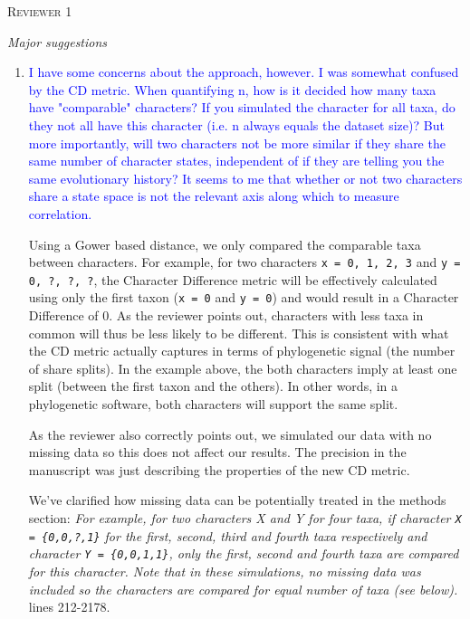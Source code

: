 \documentclass[12pt,letterpaper]{article}
\renewcommand{\section}[1]{%
\bigskip
\begin{center}
\begin{Large}
\normalfont\scshape #1
\medskip
\end{Large}
\end{center}}
\renewcommand{\subsection}[1]{%
\bigskip
\begin{center}
\begin{large}
\normalfont\itshape #1
\end{large}
\end{center}}
\begin{document}
%
%


\section{Reviewer 1}

\subsection{Major suggestions}

\begin{enumerate}

\item{\textcolor{blue}{I have some concerns about the approach, however. I was somewhat confused by the CD metric. When quantifying n, how is it decided how many taxa have "comparable" characters?
If you simulated the character for all taxa, do they not all have this character (i.e. n always equals the dataset size)?
But more importantly, will two characters not be more similar if they share the same number of character states, independent of if they are telling you the same evolutionary history?
It seems to me that whether or not two characters share a state space is not the relevant axis along which to measure correlation.}}
\label{gower}

Using a Gower based distance, we only compared the comparable taxa between characters.
For example, for two characters \texttt{x = {0, 1, 2, 3}} and \texttt{y = {0, ?, ?, ?}}, the Character Difference metric will be effectively calculated using only the first taxon (\texttt{x = {0}} and \texttt{y = {0}}) and would result in a Character Difference of 0.
As the reviewer points out, characters with less taxa in common will thus be less likely to be different.
This is consistent with what the CD metric actually captures in terms of phylogenetic signal (the number of share splits).
In the example above, the both characters imply at least one split (between the first taxon and the others).
In other words, in a phylogenetic software, both characters will support the same split.

As the reviewer also correctly points out, we simulated our data with no missing data so this does not affect our results.
The precision in the manuscript was just describing the properties of the new CD metric.

We've clarified how missing data can be potentially treated in the methods section:
\textit{For example, for two characters X and Y for four taxa, if character \texttt{X = \{0,0,?,1\}} for the first, second, third and fourth taxa respectively and character \texttt{Y = \{0,0,1,1\}}, only the first, second and fourth taxa are compared for this character.
Note that in these simulations, no missing data was included so the characters are compared for equal number of taxa (see below).} lines 212-2178.


\end{enumerate}
\end{document}
